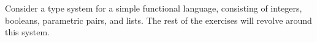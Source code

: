 

Consider a type system for a simple functional language, consisting of integers,
booleans, parametric pairs, and lists. The rest of the exercises will revolve
around this system.

\newcommand{\aint}{\lstinline|int|}
\newcommand{\abool}{\lstinline|bool|}
\newcommand{\aif}{\lstinline|if|}
\newcommand{\athen}{\lstinline|then|}
\newcommand{\aelse}{\lstinline|else|}
\newcommand{\apair}[2]{(#1, #2)}
\newcommand{\afst}[1]{\lstinline|fst|(#1)}
\newcommand{\asnd}[1]{\lstinline|snd|(#1)}
\newcommand{\alist}[1]{\lstinline|List[|#1\lstinline|]|}
\newcommand{\anil}{\lstinline|Nil()|}
\newcommand{\acons}[2]{\lstinline|Cons(|#1, #2\lstinline|)|}
\newcommand{\ato}{\lstinline|=>|}

